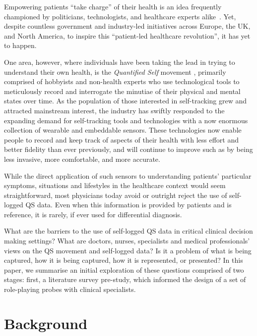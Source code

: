 \documentclass{sigchi}
\begin{document}
Empowering patients ``take charge'' of their health is an idea frequently championed by politicians, technologists, and healthcare experts alike~\cite{swan2012health}.  Yet, despite countless government and industry-led initiatives across Europe, the UK, and North America, to inspire this ``patient-led healthcare revolution'', it has yet to happen.  

One area, however, where individuals have been taking the lead in trying to understand their own health, is the \emph{Quantified Self} movement \cite{}, primarily comprised of hobbyists and non-health experts who use technological tools to meticulously record and interrogate the minutiae of their physical and mental states over time.   As the population of those interested in self-tracking grew and attracted mainstream interest, the industry has swiftly responded to the expanding demand for self-tracking tools and technologies with a now enormous collection of wearable and embeddable sensors.  These technologies now enable people to record and keep track of aspects of their health with less effort and better fidelity than ever previously, and will continue to improve such as by being less invasive, more comfortable, and more accurate.

While the direct application of such sensors to understanding patients' particular symptoms, situations and lifestyles in the healthcare context would seem straightforward, most physicians today avoid or outright reject the use of self-logged QS data. Even when this information is provided by patients and is reference, it is rarely, if ever used for differential diagnosis.  

What are the barriers to the use of self-logged QS data in critical clinical decision making settings?  What are doctors, nurses, specialists and medical professionals' views on the QS movement and self-logged data?  Is it a problem of what is being captured, how it is being captured, how it is represented, or presented?  In this paper, we summarise an initial exploration of these questions comprised of two stages: first, a literature survey pre-study, which informed the design of a set of role-playing probes with clinical specialists.

\section{Background} 
\end{document}
